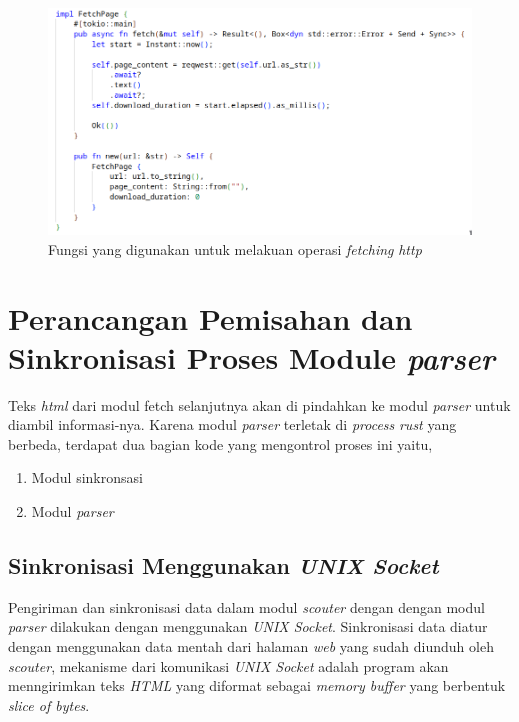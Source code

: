\begin{figure}[H]
	\centering
	\includegraphics[keepaspectratio, width=15cm]{gambar/http-request-rust-method.png}
  \caption{Fungsi yang digunakan untuk melakuan operasi \emph{fetching} \emph{http}}
	\label{gambar:http_method_rust}
\end{figure}

\section{Perancangan Pemisahan dan Sinkronisasi Proses Module \emph{parser}}

Teks \emph{html} dari modul fetch selanjutnya akan di pindahkan ke modul \emph{parser} untuk diambil informasi-nya. Karena modul \emph{parser} terletak di \emph{process} \emph{rust} yang berbeda, terdapat dua bagian kode yang mengontrol proses ini yaitu,

\begin{enumerate}
  \item Modul sinkronsasi
  \item Modul \emph{parser}
\end{enumerate}

\subsection{Sinkronisasi Menggunakan \emph{UNIX Socket}}

Pengiriman dan sinkronisasi data dalam modul \emph{scouter} dengan dengan modul \emph{parser} dilakukan dengan menggunakan \emph{UNIX Socket}. Sinkronisasi data diatur dengan menggunakan data mentah dari halaman \emph{web} yang sudah diunduh oleh \emph{scouter}, mekanisme dari komunikasi \emph{UNIX Socket} adalah program akan menngirimkan teks \emph{HTML} yang diformat sebagai \emph{memory buffer} yang berbentuk \emph{slice of bytes}.

